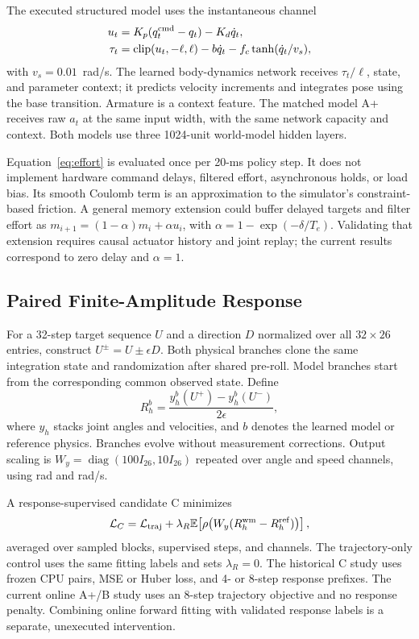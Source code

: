 The executed structured model uses the instantaneous channel
\begin{equation}
\begin{aligned}
u_t &= K_p(q^{\mathrm{cmd}}_t-q_t)-K_d\dot q_t,\\
\tau_t &= \operatorname{clip}(u_t,-\ell,\ell)-b\dot q_t
          -f_c\tanh(\dot q_t/v_s),
\end{aligned}\label{eq:effort}
\end{equation}
with $v_s=0.01$~rad/s. The learned body-dynamics network receives $\tau_t/\ell$, state, and parameter context; it predicts velocity increments and integrates pose using the base transition. Armature is a context feature. The matched model A+ receives raw $a_t$ at the same input width, with the same network capacity and context. Both models use three 1024-unit world-model hidden layers.

Equation~\eqref{eq:effort} is evaluated once per 20-ms policy step. It does not implement hardware command delays, filtered effort, asynchronous holds, or load bias. Its smooth Coulomb term is an approximation to the simulator's constraint-based friction. A general memory extension could buffer delayed targets and filter effort as $m_{i+1}=(1-\alpha)m_i+\alpha u_i$, with $\alpha=1-\exp(-\delta/T_e)$. Validating that extension requires causal actuator history and joint replay; the current results correspond to zero delay and $\alpha=1$.



\subsection{Paired Finite-Amplitude Response}
For a 32-step target sequence $U$ and a direction $D$ normalized over all $32\times26$ entries, construct $U^\pm=U\pm\epsilon D$. Both physical branches clone the same integration state and randomization after shared pre-roll. Model branches start from the corresponding common observed state. Define
\begin{equation}
R_h^b=\frac{y_h^b(U^+)-y_h^b(U^-)}{2\epsilon},
\label{eq:response}
\end{equation}
where $y_h$ stacks joint angles and velocities, and $b$ denotes the learned model or reference physics. Branches evolve without measurement corrections. Output scaling is $W_y=\operatorname{diag}(100I_{26},10I_{26})$ repeated over angle and speed channels, using rad and rad/s.

A response-supervised candidate C minimizes
\begin{equation}
\mathcal L_C=\mathcal L_{\mathrm{traj}}+\lambda_R
\mathbb{E}\!\left[\rho\!\left(W_y(R_h^{\mathrm{wm}}-R_h^{\mathrm{ref}})\right)\right],
\label{eq:loss}
\end{equation}
averaged over sampled blocks, supervised steps, and channels. The trajectory-only control uses the same fitting labels and sets $\lambda_R=0$. The historical C study uses frozen CPU pairs, MSE or Huber loss, and 4- or 8-step response prefixes. The current online A+/B study uses an 8-step trajectory objective and no response penalty. Combining online forward fitting with validated response labels is a separate, unexecuted intervention.

